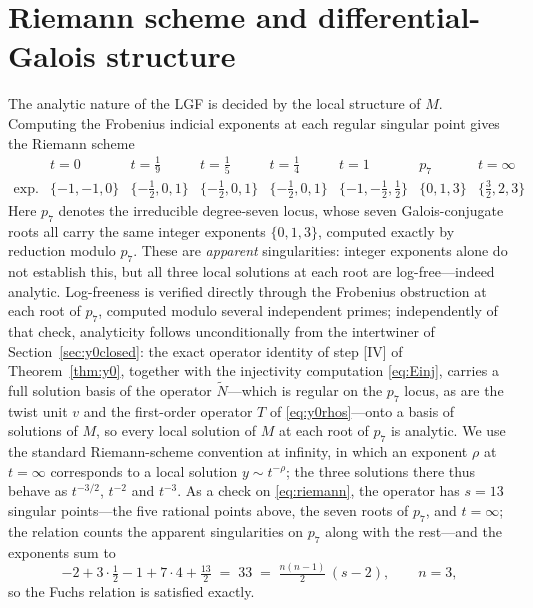\documentclass[11pt]{article}
\theoremstyle{plain}
\theoremstyle{remark}
\begin{document}
\section{Riemann scheme and differential-Galois structure}
The analytic nature of the LGF is decided by the local structure of $M$. Computing the Frobenius indicial
exponents at each regular singular point gives the Riemann scheme
{\small\setlength{\arraycolsep}{3pt}%
\begin{equation}
\begin{array}{c|ccccccc}
 & t=0 & t=\tfrac19 & t=\tfrac15 & t=\tfrac14 & t=1 & p_7 & t=\infty \\\hline
\text{exp.} & \{-1,-1,0\} & \{-\tfrac12,0,1\} & \{-\tfrac12,0,1\} & \{-\tfrac12,0,1\}
 & \{-1,-\tfrac12,\tfrac12\} & \{0,1,3\} & \{\tfrac32,2,3\}
\end{array}
\label{eq:riemann}
\end{equation}}
Here $p_7$ denotes the irreducible degree-seven locus, whose seven Galois-conjugate roots all carry the same
integer exponents $\{0,1,3\}$, computed exactly by reduction modulo $p_7$. These are \emph{apparent}
singularities: integer exponents alone do not establish this, but all three local solutions at each root are
log-free---indeed analytic. Log-freeness is verified directly through the Frobenius obstruction at each root of
$p_7$, computed modulo several independent primes; independently of that check, analyticity follows
unconditionally from the intertwiner of Section~\ref{sec:y0closed}: the exact operator identity of step [IV] of
Theorem~\ref{thm:y0}, together with the injectivity computation \eqref{eq:Einj}, carries a full solution basis of
the operator $\widetilde N$---which is regular on the $p_7$ locus, as are the twist unit $v$ and the first-order
operator $T$ of \eqref{eq:y0rhos}---onto a basis of solutions of $M$, so every local solution of $M$ at each root
of $p_7$ is analytic. We use the standard
Riemann-scheme convention at infinity, in which an exponent $\rho$ at $t=\infty$ corresponds to a local solution
$y\sim t^{-\rho}$; the three solutions there thus behave as $t^{-3/2}$, $t^{-2}$ and $t^{-3}$. As a check on
\eqref{eq:riemann}, the operator has $s=13$ singular points---the five rational points above, the seven roots of
$p_7$, and $t=\infty$; the relation counts the apparent singularities on $p_7$ along with the rest---and the
exponents sum to
\begin{equation}
-2 + 3\cdot\tfrac12 - 1 + 7\cdot 4 + \tfrac{13}{2} \;=\; 33 \;=\; \tfrac{n(n-1)}{2}\,(s-2),\qquad n=3,
\end{equation}
so the Fuchs relation is satisfied exactly.
\end{document}
